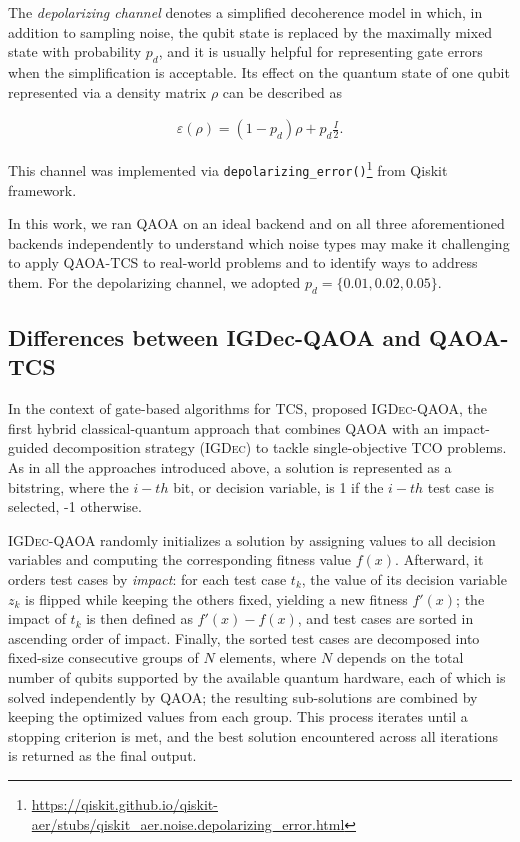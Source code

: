 \smallskip

The \textit{depolarizing channel} denotes a simplified decoherence model in which, in addition to sampling noise, the qubit state is replaced by the maximally mixed state with probability $p_d$, and it is usually helpful for representing gate errors when the simplification is acceptable. Its effect on the quantum state of one qubit represented via a density matrix $\rho$ can be described as 

\begin{align}
    \varepsilon(\rho) = (1-p_d)\rho + p_d\frac{I}{2}.
\end{align}

This channel was implemented via \texttt{depolarizing\_error()}\footnote{\url{https://qiskit.github.io/qiskit-aer/stubs/qiskit_aer.noise.depolarizing_error.html}} from Qiskit framework.


\vspace{5mm}

In this work, we ran QAOA on an ideal backend and on all three aforementioned backends independently to understand which noise types may make it challenging to apply QAOA-TCS to real-world problems and to identify ways to address them. For the depolarizing channel, we adopted $p_d=\{0.01,0.02,0.05\}$.

\subsection{Differences between IGDec-QAOA and QAOA-TCS}
In the context of gate-based algorithms for TCS, \citet{igdec_qaoa} proposed \textsc{IGDec-QAOA}, the first hybrid classical-quantum approach that combines QAOA with an impact-guided decomposition strategy (\textsc{IGDec}) to tackle single-objective TCO problems. As in all the approaches introduced above, a solution is represented as a bitstring, where the $i-th$ bit, or decision variable, is 1 if the $i-th$ test case is selected, -1 otherwise.

\textsc{IGDec-QAOA} randomly initializes a solution by assigning values to all decision variables and computing the corresponding fitness value $f(x)$. Afterward, it orders test cases by \textit{impact}: for each test case $t_k$, the value of its decision variable $z_k$ is flipped while keeping the others fixed, yielding a new fitness $f'(x)$; the impact of $t_k$ is then defined as $f'(x) - f(x)$,  and test cases are sorted in ascending order of impact. Finally, the sorted test cases are decomposed into fixed-size consecutive groups of $N$ elements, where $N$ depends on the total number of qubits supported by the available quantum hardware, each of which is solved independently by QAOA; the resulting sub-solutions are combined by keeping the optimized values from each group.
This process iterates until a stopping criterion is met, and the best solution encountered across all iterations is returned as the final output.

